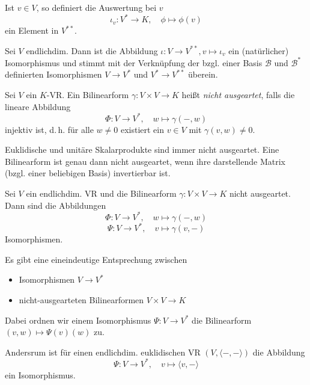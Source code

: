 \documentclass{cheat-sheet}
\newcommand{\BB}{\mathcal{B}}
\begin{document}
\begin{definition}
Ist $v \in V$, so definiert die Auswertung bei $v$
\[ \iota_v : V^* \to K, \quad \phi \mapsto \phi(v) \]
ein Element in $V^{**}$.
\end{definition}

\begin{satz}
Sei $V$ endlichdim. Dann ist die Abbildung $\iota : V \to V^{**}, v \mapsto \iota_v$ ein (natürlicher) Isomorphismus und stimmt mit der Verknüpfung der bzgl. einer Basis $\BB$ und $\mathcal{B^*}$ definierten Isomorphismen $V \to V^*$ und $V^* \to V^{**}$ überein.
\end{satz}

\begin{definition}
Sei $V$ ein $K$-VR. Ein Bilinearform $\gamma : V \times V \to K$ heißt \emph{nicht ausgeartet}, falls die lineare Abbildung
\[ \Phi : V \to V^{*}, \quad w \mapsto \gamma(-, w) \]
injektiv ist, d.\,h. für alle $w \not= 0$ existiert ein $v \in V$ mit $\gamma(v, w) \not= 0$.
\end{definition}

\begin{bem}
Euklidische und unitäre Skalarprodukte sind immer nicht ausgeartet.
Eine Bilinearform ist genau dann nicht ausgeartet, wenn ihre darstellende Matrix (bzgl. einer beliebigen Basis) invertierbar ist.
\end{bem}

\begin{satz}
Sei $V$ ein endlichdim. VR und die Bilinearform $\gamma : V \times V \to K$ nicht ausgeartet. Dann sind die Abbildungen
\[ \Phi : V \to V^*, \quad w \mapsto \gamma(-, w) \]
\[ \Psi : V \to V^*, \quad v \mapsto \gamma(v, -) \]
Isomorphismen.
\end{satz}

\begin{satz}
Es gibt eine eineindeutige Entsprechung zwischen
\begin{itemize}
  \item Isomorphismen $V \to V^*$
  \item nicht-ausgearteten Bilinearformen $V \times V \to K$
\end{itemize}

Dabei ordnen wir einem Isomorphismus $\Psi : V \to V^*$ die Bilinearform $(v, w) \mapsto \Psi(v)(w)$ zu.

Andersrum ist für einen endlichdim. euklidischen VR $(V, \langle - , - \rangle)$ die Abbildung
\[ \Psi : V \to V^*, \quad v \mapsto \langle v , - \rangle \]
ein Isomorphismus.
\end{satz}
\end{document}
